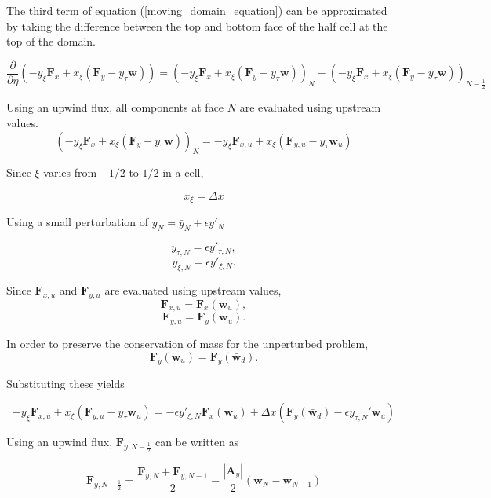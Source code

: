 \documentclass[10pt]{article}
\begin{document}
	The third term of equation (\ref{moving_domain_equation}) can be approximated by taking the difference between the top and bottom face of the half cell at the top of the domain.
	
	$$ \frac{\partial}{\partial \eta} (-y_\xi \mathbf{F}_x + x_\xi (\mathbf{F}_y - y_\tau \mathbf{w})) =  (-y_\xi \mathbf{F}_x + x_\xi (\mathbf{F}_y - y_\tau \mathbf{w}))_{N} - (-y_\xi \mathbf{F}_x + x_\xi (\mathbf{F}_y - y_\tau \mathbf{w}))_{N-\frac{1}{2}} $$
	
	Using an upwind flux, all components at face $N$ are evaluated using upstream values.
	$$ (-y_\xi \mathbf{F}_x + x_\xi (\mathbf{F}_y - y_\tau \mathbf{w}))_{N} = -y_\xi \mathbf{F}_{x,u} + x_\xi (\mathbf{F}_{y,u} - y_\tau \mathbf{w}_u)$$
	
	Since $\xi$ varies from $-1/2$ to $1/2$ in a cell,
	
	$$ x_{\xi}= \Delta x$$
	
	Using a small perturbation of $y_N = \bar{y}_N + \epsilon y'_N$ %
	
	$$ y_{\tau,N} = \epsilon y'_{\tau,N}, $$ %
	$$ y_{\xi,N} = \epsilon y'_{\xi,N}. $$
	
	Since $\mathbf{F}_{x,u}$ and $\mathbf{F}_{y,u}$ are evaluated using upstream values, 
	$$ \mathbf{F}_{x,u} = \mathbf{F}_{x}(\mathbf{w}_u), $$
	$$ \mathbf{F}_{y,u} = \mathbf{F}_{y}(\mathbf{w}_u). $$
	
	In order to preserve the conservation of mass for the unperturbed problem,
	$$ \mathbf{F}_{y}(\mathbf{w}_u) = \mathbf{F}_{y}(\bar{\mathbf{w}}_d). $$
	
	Substituting these yields
	
	\begin{equation} \label{shock_term2_pt1}
		-y_\xi \mathbf{F}_{x,u} + x_\xi (\mathbf{F}_{y,u} - y_\tau \mathbf{w}_u) 
		= -\epsilon y'_{\xi,N} \mathbf{F}_{x}(\mathbf{w}_u) + \Delta x \left( \mathbf{F}_{y}(\bar{\mathbf{w}}_d) - \epsilon y_{\tau,N}' \mathbf{w}_u \right)
	\end{equation}
	
	
	Using an upwind flux, $\mathbf{F}_{y,N-\frac{1}{2}}$ can be written as
	
	$$ \mathbf{F}_{y,N-\frac{1}{2}} = \frac{\mathbf{F}_{y,N} + \mathbf{F}_{y,N-1}}{2} - \frac{|\mathbf{A}_y|}{2}(\mathbf{w}_{N} - \mathbf{w}_{N-1}) $$
	
\end{document}
